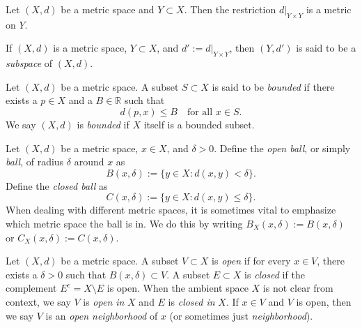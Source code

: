 \documentclass[../main.tex]{subfiles}
\begin{document}
    \begin{proposition} \label{prop:metric_restriction}
    Let \( (X, d) \) be a metric space and \( Y \subset X \). Then the restriction \( d|_{Y \times Y} \) is a metric on \( Y \).
    \end{proposition}
    
    \begin{definition} \label{def:metric_subspace}
    If \( (X, d) \) is a metric space, \( Y \subset X \), and \( d' := d|_{Y \times Y} \), then \( (Y, d') \) is said to be a \textit{subspace} of \( (X, d) \).
    \end{definition}
    
    \begin{definition} \label{def:bounded_subset}
    Let \( (X, d) \) be a metric space. A subset \( S \subset X \) is said to be \textit{bounded} if there exists a \( p \in X \) and a \( B \in \mathbb{R} \) such that
    \[
    d(p, x) \leq B \quad \text{for all } x \in S.
    \]
    We say \( (X, d) \) is \textit{bounded} if \( X \) itself is a bounded subset.
    \end{definition}
    
    \begin{definition} \label{def:open_closed_ball}
    Let \( (X, d) \) be a metric space, \( x \in X \), and \( \delta > 0 \). Define the \textit{open ball}, or simply \textit{ball}, of radius \( \delta \) around \( x \) as
    \[
    B(x, \delta) := \{ y \in X : d(x,y) < \delta \}.
    \]
    Define the \textit{closed ball} as
    \[
    C(x, \delta) := \{ y \in X : d(x,y) \leq \delta \}.
    \]
    When dealing with different metric spaces, it is sometimes vital to emphasize which metric space the ball is in. We do this by writing \( B_X(x, \delta) := B(x, \delta) \) or \( C_X(x, \delta) := C(x, \delta) \).
    \end{definition}
    
    \begin{definition} \label{def:open_closed_sets}
    Let \( (X, d) \) be a metric space. A subset \( V \subset X \) is \textit{open} if for every \( x \in V \), there exists a \( \delta > 0 \) such that \( B(x, \delta) \subset V \). A subset \( E \subset X \) is \textit{closed} if the complement \( E^c = X \setminus E \) is open. When the ambient space \( X \) is not clear from context, we say \( V \) is \textit{open in} \( X \) and \( E \) is \textit{closed in} \( X \).
    If \( x \in V \) and \( V \) is open, then we say \( V \) is an \textit{open neighborhood} of \( x \) (or sometimes just \textit{neighborhood}).
    \end{definition}
    
\end{document}
